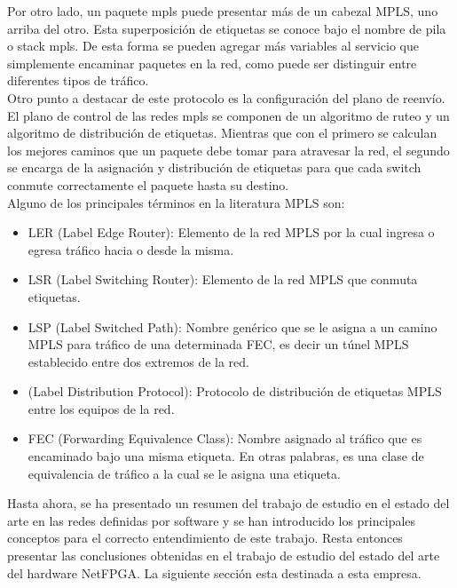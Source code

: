 Por otro lado, un paquete mpls puede presentar más de un cabezal MPLS, uno arriba del otro. Esta superposición de etiquetas se conoce bajo el nombre de pila o stack mpls. De esta forma se pueden agregar más variables al servicio que simplemente encaminar paquetes en la red, como puede ser distinguir entre diferentes tipos de tráfico.\\

Otro punto a destacar de este protocolo es la configuración del plano de reenvío. El plano de control de las redes mpls se componen de un algoritmo de ruteo y un algoritmo de distribución de etiquetas. Mientras que con el primero se calculan los mejores caminos que un paquete debe tomar para atravesar la red, el segundo se encarga de la asignación y distribución de etiquetas para que cada switch conmute correctamente el paquete hasta su destino.\\

Alguno de los principales términos en la literatura MPLS son:

\begin{itemize}
\item LER (Label Edge Router): Elemento de la red MPLS por la cual ingresa o egresa tráfico hacia o desde la misma.
\item LSR (Label Switching Router): Elemento de la red MPLS que conmuta etiquetas.
\item LSP (Label Switched Path): Nombre genérico que se le asigna a un camino MPLS para tráfico de una determinada FEC, es decir un túnel MPLS establecido entre dos extremos de la red.
\item {} (Label Distribution Protocol): Protocolo de distribución de etiquetas MPLS entre los equipos de la red.
\item FEC (Forwarding Equivalence Class): Nombre asignado al tráfico que es encaminado bajo una misma etiqueta. En otras palabras, es una clase de equivalencia de tráfico a la cual se le asigna una etiqueta.
 
\end{itemize}
\vspace{1cm}

Hasta ahora, se ha presentado un resumen del trabajo de estudio en el estado del arte en las redes definidas por software y se han introducido los principales conceptos para el correcto entendimiento de este trabajo. Resta entonces presentar las conclusiones obtenidas en el trabajo de estudio del estado del arte del hardware NetFPGA. La siguiente secci\'on esta destinada a esta empresa.

